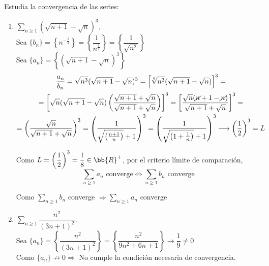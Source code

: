 \documentclass[12pt]{article}
\begin{document}
    \begin{ejercicio}[3 puntos]
        Estudia la convergencia de las series:
        \begin{enumerate}
            \item $\sum\limits_{n\geq 1} ( \sqrt{n+1} - \sqrt{n})^3$.\\
            Sea $\{b_n\} = \left\{ n ^{ -\frac{3}{2}} \right\} = \left\{ \dfrac{1}{n^{\frac{3}{2}}}\right\} = \left\{ \dfrac{1}{\sqrt{n^2}}\right\}$\\

            Sea $\{a_n\} = \left\{ (\sqrt{n+1} - \sqrt{n})^3\right\}$\\
            \begin{gather*}
                \dfrac{a_n}{b_n} = \sqrt{n^3} (\sqrt{n+1} - \sqrt{n})^3 = \left[ \sqrt[6]{n^3} (\sqrt{n+1} - \sqrt{n})\right]^3 = \\
                =\left[ \sqrt{n} (\sqrt{n+1} - \sqrt{n}) \left( \dfrac{\sqrt{n+1} + \sqrt{n}}{\sqrt{n+1} + \sqrt{n}}\right)\right]^3 = \left[ \dfrac{\sqrt{n}(\cancel{n}+1-\cancel{n})}{\sqrt{n+1}+ \sqrt{n}}\right]^3 = \\
                = \left( \dfrac{\sqrt{n}}{\sqrt{n+1} + \sqrt{n}}\right)^3 = \left( \dfrac{1}{\sqrt{\left( \frac{n+1}{n}\right) }+1}\right)^3 = \left( \dfrac{1}{\sqrt{\left( 1+ \frac{1}{n}\right) }+1}\right)^3 \longrightarrow \left( \dfrac{1}{2}\right)^3 = L
            \end{gather*}

            Como $L= \left( \dfrac{1}{2}\right)^3 = \dfrac{1}{8}\in \bb{R}^+$, por el criterio límite de comparación,
            \[
                \sum\limits_{n\geq 1} a_n \text{ converge} \Longleftrightarrow \sum\limits_{n\geq 1} b_n \text{ converge}
            \]

            Como $\sum\limits_{n\geq 1} b_n$ converge $\Longrightarrow \sum\limits_{n\geq 1} a_n$ converge
            
            \item $\sum\limits_{n\geq 1} \dfrac{n^2}{(3n+1)^2}$.\\

            Sea $\{a_n\}=\left\{ \dfrac{n^2}{(3n+1)^2} \right\} = \left\{ \dfrac{n^2}{9n^2 + 6n + 1}\right\} \longrightarrow \dfrac{1}{9} \neq 0$\\

            Como $\{a_n\} \nrightarrow 0 \Longrightarrow$ No cumple la condición necesaria de convergencia.\\


\end{enumerate}
\end{ejercicio}
\end{document}
